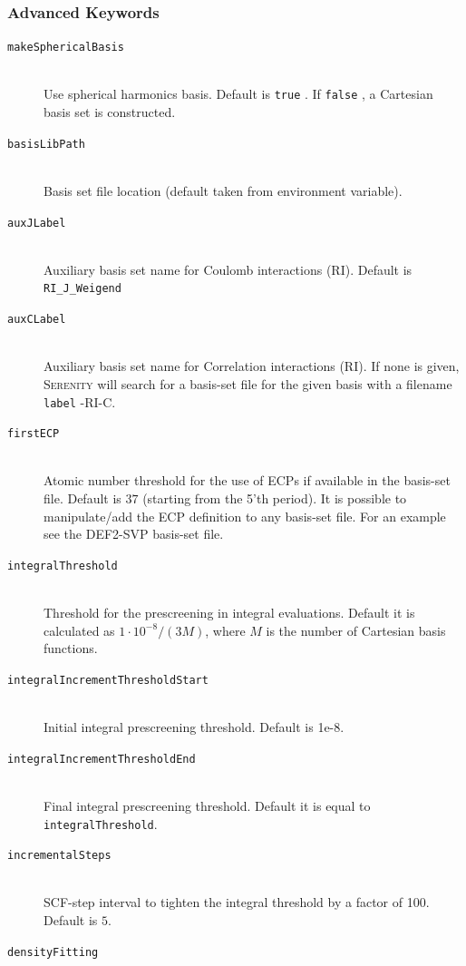 \documentclass[bibliography=totocnumbered,a4paper,10pt,oneside]{scrbook}
\newcommand{
\serenity}{\textsc{Serenity}\xspace}
\newcommand{\ttt}[1]{%
  \begingroup\setlength{\fboxsep}{1pt}%
  \colorbox{serenity-green!30}{\texttt{\hspace*{2pt}\vphantom{(g}#1\hspace*{2pt}}}%
  \endgroup
}
\begin{document}
\subsubsection{Advanced Keywords}
\begin{description}
    \item [\texttt{makeSphericalBasis}]\hfill \\
    Use spherical harmonics basis. Default is \ttt{true}. If \ttt{false}, a Cartesian basis set is constructed.
    \item [\texttt{basisLibPath}]\hfill \\
    Basis set file location (default taken from environment variable).
    \item [\texttt{auxJLabel}]\hfill \\
    Auxiliary basis set name for Coulomb interactions (RI). Default is \ttt{RI\_J\_Weigend}
    \item [\texttt{auxCLabel}]\hfill \\
    Auxiliary basis set name for Correlation interactions (RI). If none is given, \serenity will search for a
    basis-set file for the given basis with a filename \ttt{label}-RI-C.
    \item [\texttt{firstECP}]\hfill \\
    Atomic number threshold for the use of ECPs if available in the basis-set file. Default is $37$ (starting from the 5'th period).
    It is possible to manipulate/add the ECP definition to any basis-set file. For an example see the DEF2-SVP basis-set file.
    \item [\texttt{integralThreshold}]\hfill \\
    Threshold for the prescreening in integral evaluations. Default it is calculated as $1\cdot 10^{-8}/(3 M)$, where $M$ is
    the number of Cartesian basis functions.
    \item [\texttt{integralIncrementThresholdStart}]\hfill \\
    Initial integral prescreening threshold. Default is 1e-8.
    \item [\texttt{integralIncrementThresholdEnd}]\hfill \\
    Final integral prescreening threshold. Default it is equal to \texttt{integralThreshold}.
    \item [\texttt{incrementalSteps}]\hfill \\
    SCF-step interval to tighten the integral threshold by a factor of 100. Default is $5$.
    \item [\texttt{densityFitting}]\hfill \\

\end{description}
\end{document}
